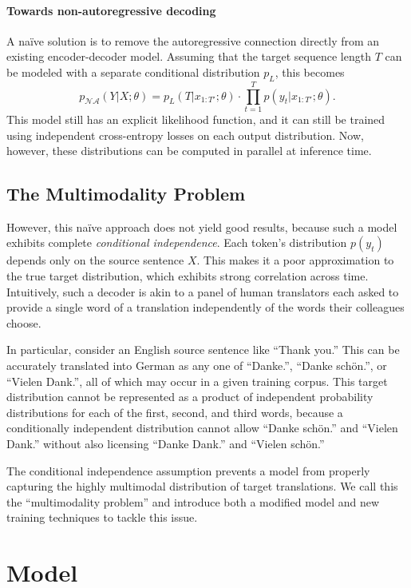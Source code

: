 \paragraph{Towards non-autoregressive decoding}
A na\"{i}ve solution is to remove the autoregressive connection directly from an existing encoder-decoder model. Assuming that the target sequence length $T$ can be modeled with a separate conditional distribution $p_L$, this becomes
\begin{equation}
p_{\mathcal{NA}}(Y|X; \theta) = p_L(T|x_{1:T'};\theta)\cdot \prod_{t=1}^T p(y_t| x_{1:T'};\theta).
\label{eq.simple}
\end{equation}
This model still has an explicit likelihood function, and it can still be trained using independent cross-entropy losses on each output distribution. Now, however, these distributions can be computed in parallel at inference time. 

\subsection{The Multimodality Problem}
However, this na\"{i}ve approach does not yield good results, because such a model exhibits complete \emph{conditional independence}.
Each token's distribution $p(y_t)$  depends only on the source sentence $X$. 
This makes it a poor approximation to the true target distribution, which exhibits strong correlation across time. 
Intuitively, such a decoder is akin to a panel of human translators each asked to provide a single word of a translation independently of the words their colleagues choose.

In particular, consider an English source sentence like ``Thank you.'' This can be accurately translated into German as any one of ``Danke.'', ``Danke sch\"{o}n.'', or ``Vielen Dank.'', all of which may occur in a given training corpus. This target distribution cannot be represented as a product of independent probability distributions for each of the first, second, and third words, because a conditionally independent distribution cannot allow ``Danke sch\"{o}n.'' and ``Vielen Dank.'' without also licensing ``Danke Dank.'' and ``Vielen sch\"{o}n.''

The conditional independence assumption prevents a model from properly capturing the highly multimodal distribution of target translations.
We call this the ``multimodality problem'' and introduce both a modified model and new training techniques to tackle this issue.

\section{Model}
\label{cp8.sec.mainModelSection}

